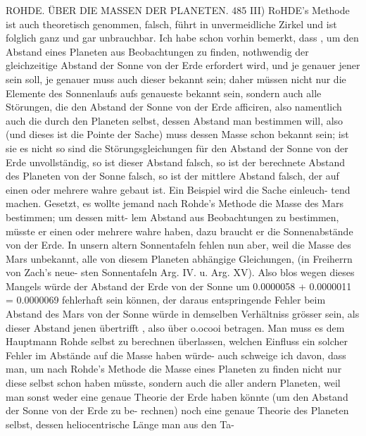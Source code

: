 \documentclass[10pt,a4paper]{article}
\begin{document}
ROHDE.     ÜBER  DIE  MASSEN  DER  PLANETEN.  485
III)  RoHDE's  Methode  ist  auch  theoretisch  genommen,  falsch,  führt  in  unvermeidliche  Zirkel  und
ist  folglich  ganz  und  gar  unbrauchbar.
Ich  habe  schon  vorhin  bemerkt,  dass ,  um  den  Abstand  eines  Planeten  aus  Beobachtungen  zu
finden,  nothwendig  der  gleichzeitige  Abstand  der  Sonne  von  der  Erde  erfordert  wird,  und  je  genauer
jener  sein  soll,  je  genauer  muss  auch  dieser  bekannt  sein;  daher  müssen  nicht  nur  die  Elemente  des
Sonnenlaufs  aufs  genaueste  bekannt  sein,  sondern  auch  alle  Störungen,  die  den  Abstand  der  Sonne  von
der  Erde  afficiren,  also  namentlich  auch  die  durch  den  Planeten  selbst,  dessen  Abstand  man  bestimmen
will,  also  (und  dieses  ist  die  Pointe  der  Sache)  muss  dessen  Masse  schon  bekannt  sein;  ist  sie  es  nicht
so  sind  die  Störungsgleichungen  für  den  Abstand  der  Sonne  von  der  Erde  unvollständig,  so  ist  dieser
Abstand  falsch,  so  ist  der  berechnete  Abstand  des  Planeten  von  der  Sonne  falsch,  so  ist  der  mittlere
Abstand  falsch,  der  auf  einen  oder  mehrere  wahre  gebaut  ist.  Ein  Beispiel  wird  die  Sache  einleuch-
tend machen.
Gesetzt,  es  wollte  jemand  nach  Rohde's  Methode  die  Masse  des  Mars  bestimmen;  um  dessen  mitt-
lem Abstand  aus  Beobachtungen  zu  bestimmen,  müsste  er  einen  oder  mehrere  wahre  haben,  dazu  braucht
er  die  Sonnenabstände  von  der  Erde.  In  unsern  altern  Sonnentafeln  fehlen  nun  aber,  weil  die  Masse
des  Mars  unbekannt,  alle  von  diesem  Planeten  abhängige  Gleichungen,  (in  Freiherrn  von  Zach's  neue-
sten Sonnentafeln  Arg.  IV.  u.  Arg.  XV).  Also  blos  wegen  dieses  Mangels  würde  der  Abstand  der  Erde
von  der  Sonne  um  0.0000058  +  0.0000011  =  0.0000069  fehlerhaft  sein  können,  der  daraus  entspringende
Fehler  beim  Abstand  des  Mars  von  der  Sonne  würde  in  demselben  Verhältniss  grösser  sein,  als  dieser
Abstand  jenen  übertrifft ,  also  über  o.ocooi  betragen.  Man  muss  es  dem  Hauptmann  Rohde  selbst  zu
berechnen  überlassen,  welchen  Einfluss  ein  solcher  Fehler  im  Abstände  auf  die  Masse  haben  würde-
auch  schweige  ich  davon,  dass  man,  um  nach  Rohde's  Methode  die  Masse  eines  Planeten  zu  finden
nicht  nur  diese  selbst  schon  haben  müsste,  sondern  auch  die  aller  andern  Planeten,  weil  man  sonst
weder  eine  genaue  Theorie  der  Erde  haben  könnte  (um  den  Abstand  der  Sonne  von  der  Erde  zu  be-
rechnen) noch  eine  genaue  Theorie  des  Planeten  selbst,  dessen  heliocentrische  Länge  man  aus  den  Ta-
\end{document}
